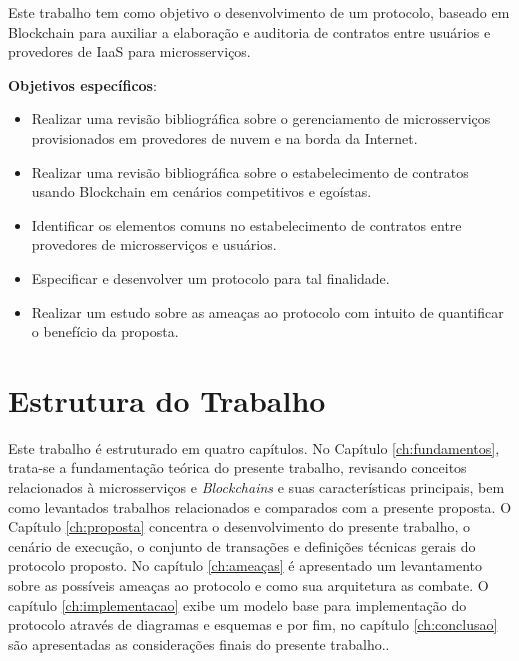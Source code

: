 Este trabalho tem como objetivo o desenvolvimento de um protocolo, baseado em
Blockchain para auxiliar a elaboração e auditoria de contratos entre usuários e provedores de IaaS para microsserviços.

\vskip 0.5cm
\noindent\textbf{Objetivos específicos}: 
\begin{itemize}
    \item Realizar uma revisão bibliográfica sobre o gerenciamento de microsserviços provisionados em provedores de nuvem e na borda da Internet.
    \item Realizar uma revisão bibliográfica sobre o estabelecimento de contratos usando Blockchain em cenários competitivos e egoístas.
    \item Identificar os elementos comuns no estabelecimento de contratos entre provedores de microsserviços e usuários.
    \item Especificar e desenvolver um protocolo para tal finalidade.
    \item Realizar um estudo sobre as ameaças ao protocolo com intuito de quantificar o benefício da proposta.
\end{itemize}


\section{Estrutura do Trabalho}

Este trabalho é estruturado em quatro capítulos. No Capítulo \ref{ch:fundamentos}, trata-se a fundamentação teórica do presente trabalho, revisando conceitos relacionados à microsserviços e \textit{Blockchains} e suas características principais, bem como levantados trabalhos relacionados e comparados com a presente proposta. O Capítulo \ref{ch:proposta} concentra o desenvolvimento do presente trabalho, o cenário de execução, o conjunto de transações e definições técnicas gerais do protocolo proposto. No capítulo \ref{ch:ameaças} é apresentado um levantamento sobre as possíveis ameaças ao protocolo e como sua arquitetura as combate. O capítulo \ref{ch:implementacao} exibe um modelo base para implementação do protocolo através de diagramas e esquemas e por fim, no capítulo \ref{ch:conclusao} são apresentadas as considerações finais do presente trabalho..

